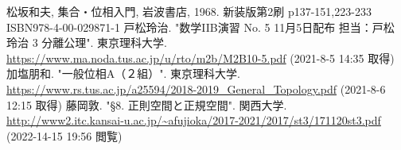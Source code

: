 \documentclass[dvipdfmx]{jsarticle}
\begin{document}
\begin{thebibliography}{50}
  松坂和夫, 集合・位相入門, 岩波書店, 1968. 新装版第2刷 p137-151,223-233 ISBN978-4-00-029871-1
  戸松玲治. "数学IIB演習 No. 5 11月5日配布 担当：戸松 玲治 3 分離公理". 東京理科大学. \url{https://www.ma.noda.tus.ac.jp/u/rto/m2b/M2B10-5.pdf} (2021-8-5 14:35 取得)
  加塩朋和. "一般位相A（２組）". 東京理科大学. \url{https://www.rs.tus.ac.jp/a25594/2018-2019_General_Topology.pdf} (2021-8-6 12:15 取得)
  藤岡敦. "§8. 正則空間と正規空間". 関西大学. \url{http://www2.itc.kansai-u.ac.jp/~afujioka/2017-2021/2017/st3/171120st3.pdf} (2022-14-15 19:56 閲覧)
\end{thebibliography}
\end{document}
